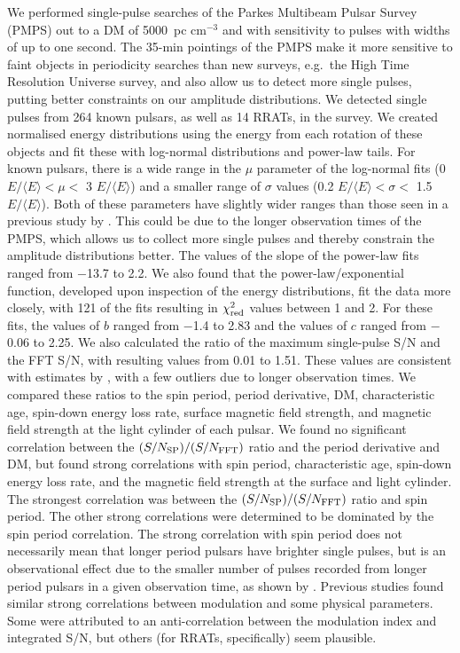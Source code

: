 \documentclass[fleqn,usenatbib]{mnras}
\begin{document}
We performed single-pulse searches of the Parkes Multibeam Pulsar Survey (PMPS) out to a DM of 
5000~pc cm$^{-3}$ and with sensitivity to pulses with widths of up to one second. The 35-min pointings of the PMPS make it more sensitive to faint objects in periodicity searches than new surveys, e.g.\ the High Time Resolution Universe survey, and also allow us to detect more single pulses, putting better constraints on our amplitude distributions. We detected single pulses from 264 known pulsars, 
as well as 14 RRATs, in the survey. We created normalised energy distributions using the energy 
from each rotation of these objects and fit these with log-normal distributions and power-law 
tails. For known pulsars, there is a wide range in the $\mu$ parameter of the log-normal fits 
(0 $E/\langle{E}\rangle < \mu <$ 3 $E/\langle{E}\rangle$) and a smaller range of 
$\sigma$ values (0.2 $E/\langle{E}\rangle < \sigma <$ 1.5 $E/\langle{E}\rangle$). Both 
of these parameters have slightly wider ranges than those seen in a previous study by 
\citet{Burke-Spolaor:2012}. This could be due to the longer observation times of the PMPS, which 
allows us to collect more single pulses and thereby constrain the amplitude distributions better. 
The values of the slope of the power-law fits ranged from $-$13.7 to 2.2. We also found that the power-law/exponential function, developed upon inspection of the energy distributions, fit the data more closely, with 121 of the fits resulting in $\chi_{\rm red}^2$ values between 1 and 2. For these fits, the values of $b$ ranged from $-$1.4 to 2.83 and the values of $c$ ranged from $-$0.06 to 2.25. We also calculated the ratio of the maximum single-pulse S/N and the FFT S/N, with resulting values from 0.01 to 1.51. These values are consistent with estimates by \citet{Deneva:2009}, with a few outliers due to longer observation times. We compared these ratios to the spin period, period derivative, DM, characteristic age, spin-down energy loss rate, surface magnetic field strength, and magnetic field strength at the light cylinder of each pulsar. We found no significant correlation between the 
$(S/N_{\rm SP})/(S/N_{\rm FFT})$ ratio and the period derivative and DM, but found strong correlations 
with spin period, characteristic age, spin-down energy loss rate, and the magnetic field strength 
at the surface and light cylinder. The strongest correlation was between the $(S/N_{\rm SP})/(S/N_{\rm FFT})$ 
ratio and spin period. The other strong correlations were determined to be dominated by the spin 
period correlation. The strong correlation with spin period does not necessarily mean that longer period pulsars have brighter single pulses, but is an observational effect due to the smaller number of pulses recorded from longer period pulsars in a given observation time, as shown by \citet{McLaughlin:2003}. Previous studies found similar strong correlations between modulation and some physical parameters. Some were attributed to an anti-correlation between the modulation index and integrated S/N, but others (for RRATs, specifically) seem plausible.
\end{document}
